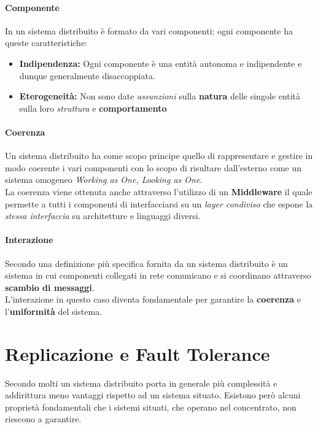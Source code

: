 		\paragraph{Componente}
		In un sistema distribuito è formato da vari componenti; ogni componente ha queste caratteristiche:
		\begin{itemize}
		 	\item{\textbf{Indipendenza:}}
		 	Ogni componente è una entità autonoma e indipendente e dunque generalmente disaccoppiata.
		 	\item{\textbf{Eterogeneità:}}
		 	Non sono date \textit{assunzioni} sulla \textbf{natura} delle singole entità sulla loro \textit{struttura} e \textbf{comportamento}
		\end{itemize}
		\paragraph{Coerenza}
		Un sistema distribuito ha come scopo principe quello di rappresentare e gestire in modo coerente i vari componenti con lo scopo di risultare dall'esterno come un sistema omogeneo \emph{Working as One, Looking as One}.\\
		La coerenza viene ottenuta anche attraverso l'utilizzo di un \textbf{Middleware} il quale permette a tutti i componenti di interfacciarsi su un \textit{layer condiviso} che espone la \textit{stessa interfaccia} su architetture e linguaggi diversi.
		\paragraph{Interazione}
		Secondo una definizione più specifica fornita da \cite[Colouris:2012]{Colouris:2012} un sistema distribuito è un sistema in cui componenti collegati in rete comunicano e si coordinano attraverso \textbf{scambio di messaggi}.\\
		L'interazione in questo caso diventa fondamentale per garantire la \textbf{coerenza} e l'\textbf{uniformità} del sistema.

	\section{Replicazione e Fault Tolerance}
	Secondo molti un sistema distribuito porta in generale più complessità e addirittura meno vantaggi rispetto ad un sistema situato. Esistono però alcuni proprietà fondamentali che i sistemi situati, che operano nel concentrato, non riescono a garantire.
